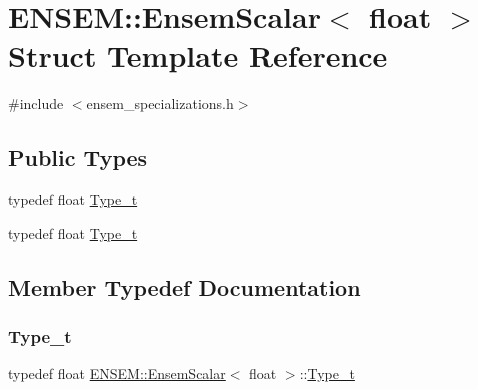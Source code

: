 \hypertarget{structENSEM_1_1EnsemScalar_3_01float_01_4}{}\section{E\+N\+S\+EM\+:\+:Ensem\+Scalar$<$ float $>$ Struct Template Reference}
\label{structENSEM_1_1EnsemScalar_3_01float_01_4}


{\ttfamily \#include $<$ensem\+\_\+specializations.\+h$>$}

\subsection*{Public Types}
\begin{DoxyCompactItemize}
\item 
typedef float \mbox{\hyperlink{structENSEM_1_1EnsemScalar_3_01float_01_4_a908908baf5b54ef6561962c858fb7183}{Type\+\_\+t}}
\item 
typedef float \mbox{\hyperlink{structENSEM_1_1EnsemScalar_3_01float_01_4_a908908baf5b54ef6561962c858fb7183}{Type\+\_\+t}}
\end{DoxyCompactItemize}


\subsection{Member Typedef Documentation}
\mbox{\label{structENSEM_1_1EnsemScalar_3_01float_01_4_a908908baf5b54ef6561962c858fb7183}} 
\subsubsection{\texorpdfstring{Type\_t}{Type\_t}\hspace{0.1cm}{\footnotesize\ttfamily [1/2]}}
{\footnotesize\ttfamily typedef float \mbox{\hyperlink{structENSEM_1_1EnsemScalar}{E\+N\+S\+E\+M\+::\+Ensem\+Scalar}}$<$ float $>$\+::\mbox{\hyperlink{structENSEM_1_1EnsemScalar_3_01float_01_4_a908908baf5b54ef6561962c858fb7183}{Type\+\_\+t}}}

\mbox{\label{structENSEM_1_1EnsemScalar_3_01float_01_4_a908908baf5b54ef6561962c858fb7183}} 
